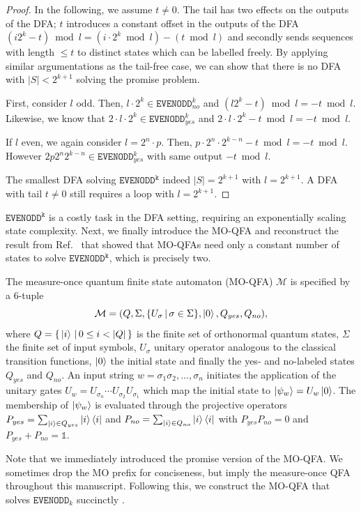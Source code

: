 \documentclass[../main.tex]{subfiles}
\begin{document}
\begin{proof}
In the following, we assume $t \neq 0$. The tail has two effects on the outputs of the DFA; $t$ introduces a constant offset in the outputs of the DFA $(i 2^k - t) \bmod l = (i \cdot 2^k\bmod l) - (t \bmod l)$ and secondly sends sequences with length $\leq t$ to distinct states which can be labelled freely. By applying similar argumentations as the tail-free case, we can show that there is no DFA with $|S| < 2^{k+1}$ solving the promise problem.

First, consider $l$ odd. Then, $l \cdot 2^{k} \in \mathtt{EVENODD}_{no}^{k}$ and  $(l 2^{k} - t) \bmod l = - t \bmod l$. Likewise, we know that $2 \cdot l \cdot 2^{k} \in \mathtt{EVENODD}_{yes}^{k}$ and $2\cdot l \cdot 2^{k} - t \bmod l = - t \bmod l$.

If $l$ even, we again consider $l = 2^{n} \cdot p$. Then, 
$p \cdot 2^n \cdot 2^{k-n} - t \bmod l = - t \bmod l$. However $2 p 2^n 2^{k-n} \in \mathtt{EVENODD}_{yes}^{k}$ with same output $- t \bmod l$.

The smallest DFA solving $\mathtt{EVENODD^k}$ indeed $|S| = 2^{k+1}$ with $l = 2^{k+1}$. A DFA with tail $t \neq 0$ still requires a loop with $l = 2^{k+1}$.
\end{proof}

$\mathtt{EVENODD^k}$ is a costly task in the DFA setting, requiring an exponentially scaling state complexity. Next, we finally introduce the \ac{MO-QFA} and reconstruct the result from Ref.~\cite{ambainis2012superiority} that showed that \acp{MO-QFA} need only a constant number of states to solve $\mathtt{EVENODD^k}$, which is precisely two.

\begin{definition}
The measure-once quantum finite state automaton (MO-QFA) $\mathcal{M}$ is specified by a 6-tuple
\begin{equation}
    \mathcal{M} = (Q, \Sigma, \{U_\sigma \,|\, \sigma \in \Sigma \}, \ket{0}, Q_{yes}, Q_{no}) ,
\end{equation}
where $Q = \{\, \ket{i} \,|\, 0\leq i<|Q|\,\}$ is the finite set of orthonormal quantum states, $\Sigma$ the finite set of input symbols, $U_\sigma$ unitary operator analogous to the classical transition functions, $\ket{0}$ the initial state and finally the yes- and no-labeled states $Q_{yes}$ and $Q_{no}$. An input string $w = \sigma_1 \sigma_2, \dots,\sigma_n$ initiates the application of the unitary gates $U_w = U_{\sigma_n}\cdots U_{\sigma_2} U_{\sigma_1} $ which map the initial state to $\ket{\psi_w} = U_w \ket{0}$. The membership of $\ket{\psi_w}$ is evaluated through the projective operators $P_{yes} = \sum_{\ket{i} \in Q_{yes}} \ket{i} \bra{i}$ and $P_{no} = \sum_{\ket{i} \in Q_{no}} \ket{i} \bra{i}$ with $P_{yes}P_{no} = 0$ and $P_{yes} + P_{no} = \mathds{1}$.
\end{definition}
Note that we immediately introduced the promise version of the MO-QFA. We sometimes drop the MO prefix for conciseness, but imply the measure-once QFA throughout this manuscript.
Following this, we construct the \ac{MO-QFA} that solves $\mathtt{EVENODD}_k$ succinctly \cite{ambainis2012superiority,geffert2014classical,rashid2014implications}.
\end{document}
